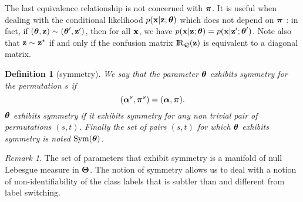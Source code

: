 \documentclass[]{imsart}
\newcommand{\1}{\mathds{1}}
\numberwithin{equation}{section}
\theoremstyle{plain}
\newtheorem{dof}[thm]{Definition}
\theoremstyle{remark}
\newtheorem{rem}[thm]{Remark}
\begin{document}
  
The last equivalence relationship is not concerned with $\boldsymbol{\pi}$. It is useful when dealing with the conditional likelihood $p(\mathbf{x}| \mathbf{z}; \boldsymbol{\theta})$ which does not depend on $\boldsymbol{\pi}$ :  in fact, if $(\boldsymbol{\theta}, \mathbf{z}) \sim (\boldsymbol{\theta}', \mathbf{z}')$, then for all $\mathbf{x}$, we have $p(\mathbf{x}| \mathbf{z}; \boldsymbol{\theta}) = p(\mathbf{x}| \mathbf{z}'; \boldsymbol{\theta}')$. 
Note also that $\mathbf{z} \sim \mathbf{z}^\star$  if and only if the confusion matrix $\RQbz$  is equivalent to a diagonal matrix. 

\begin{dof}[symmetry]
  \label{def:symmetry}
  We say that the parameter $\boldsymbol{\theta}$ \emph{exhibits symmetry for the permutation} $s$ if
  \begin{equation*}
    (\bpi^s, \bal^{s}) = (\bpi, \bal).
  \end{equation*}
  $\boldsymbol{\theta}$ \emph{exhibits symmetry} if it exhibits symmetry for any non trivial pair of permutations $(s,t)$. Finally the set of pairs $(s,t)$ for which $\boldsymbol{\theta}$ exhibits symmetry is noted $\operatorname{Sym}(\boldsymbol{\theta})$.
\end{dof}


\begin{rem}
  The set of parameters that exhibit symmetry is a manifold of null Lebesgue measure in $\boldsymbol{\Theta}$.  The notion of symmetry allows us to deal with a notion of non-identifiability of the class labels that is subtler than and different from label switching.\\
\end{rem}
\end{document}

